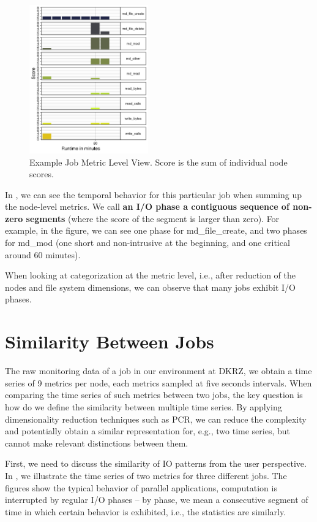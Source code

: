 \documentclass[]{llncs}
\begin{document}
\begin{figure}
	\centering
	\includegraphics[width=2.02in,height=2.52in]{./media/image4.png}
	\caption{Example Job Metric Level View. Score is the sum of individual node scores.}
	\label{fig:seg_example}
\end{figure}

In , we can see the temporal behavior for this particular job when summing up the node-level metrics.
We call \textbf{an I/O phase a contiguous sequence of non-zero segments} (where the score of the segment is larger than zero).
For example, in the figure, we can see one phase for md\_file\_create, and two phases for md\_mod (one short and non-intrusive at the beginning, and one critical around 60 minutes).

When looking at categorization at the metric level, i.e., after reduction of the nodes and file system dimensions, we can observe that many jobs exhibit I/O phases. 

\section{Similarity Between Jobs}
The raw monitoring data of a job in our environment at DKRZ, we obtain a time series of 9 metrics per node, each metrics sampled at five seconds intervals.
When comparing the time series of such metrics between two jobs, the key question is how do we define the similarity between multiple time series.
By applying dimensionality reduction techniques such as PCR, we can reduce the complexity and potentially obtain a similar representation for, e.g., two time series, but cannot make relevant distinctions between them.

First, we need to discuss the similarity of IO patterns from the user perspective.
In , we illustrate the time series of two metrics for three different jobs.
The figures show the typical behavior of parallel applications, computation is interrupted by regular I/O phases -- by phase, we mean a consecutive segment of time in which  certain behavior is exhibited, i.e., the statistics are similarly.
\end{document}
